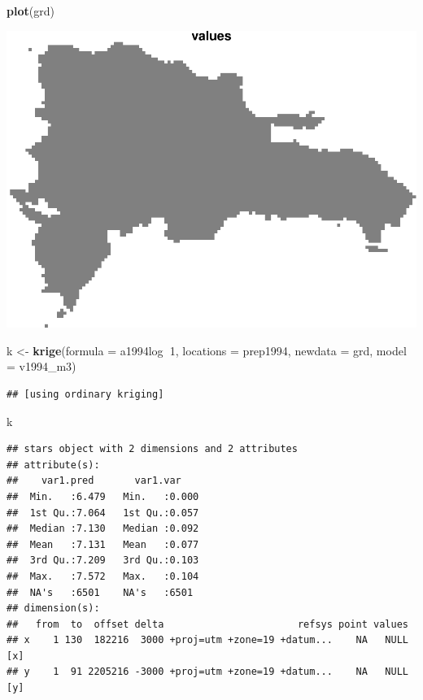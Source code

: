 \documentclass[11pt,]{article}
\newenvironment{Shaded}{\begin{snugshade}}{\end{snugshade}}
\newcommand{\KeywordTok}[1]{\textcolor[rgb]{0.13,0.29,0.53}{\textbf{#1}}}
\newcommand{\DataTypeTok}[1]{\textcolor[rgb]{0.13,0.29,0.53}{#1}}
\newcommand{\DecValTok}[1]{\textcolor[rgb]{0.00,0.00,0.81}{#1}}
\newcommand{\StringTok}[1]{\textcolor[rgb]{0.31,0.60,0.02}{#1}}
\newcommand{\OperatorTok}[1]{\textcolor[rgb]{0.81,0.36,0.00}{\textbf{#1}}}
\newcommand{\NormalTok}[1]{#1}
\begin{document}
\begin{Shaded}
\begin{Highlighting}[]
\KeywordTok{plot}\NormalTok{(grd)}
\end{Highlighting}
\end{Shaded}

\includegraphics{proyecto_files/figure-latex/unnamed-chunk-4-9.pdf}

\begin{Shaded}
\begin{Highlighting}[]
\NormalTok{k <-}\StringTok{ }\KeywordTok{krige}\NormalTok{(}\DataTypeTok{formula =}\NormalTok{ a1994log}\OperatorTok{~}\DecValTok{1}\NormalTok{, }\DataTypeTok{locations =}\NormalTok{ prep1994, }\DataTypeTok{newdata =}\NormalTok{ grd, }\DataTypeTok{model =}\NormalTok{ v1994_m3)}
\end{Highlighting}
\end{Shaded}

\begin{verbatim}
## [using ordinary kriging]
\end{verbatim}

\begin{Shaded}
\begin{Highlighting}[]
\NormalTok{k}
\end{Highlighting}
\end{Shaded}

\begin{verbatim}
## stars object with 2 dimensions and 2 attributes
## attribute(s):
##    var1.pred       var1.var     
##  Min.   :6.479   Min.   :0.000  
##  1st Qu.:7.064   1st Qu.:0.057  
##  Median :7.130   Median :0.092  
##  Mean   :7.131   Mean   :0.077  
##  3rd Qu.:7.209   3rd Qu.:0.103  
##  Max.   :7.572   Max.   :0.104  
##  NA's   :6501    NA's   :6501   
## dimension(s):
##   from  to  offset delta                       refsys point values    
## x    1 130  182216  3000 +proj=utm +zone=19 +datum...    NA   NULL [x]
## y    1  91 2205216 -3000 +proj=utm +zone=19 +datum...    NA   NULL [y]
\end{verbatim}
\end{document}
